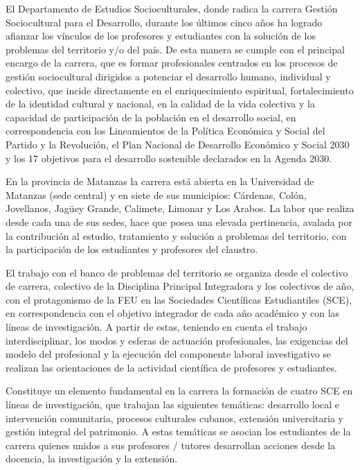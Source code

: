 El Departamento de Estudios Socioculturales, donde radica la carrera Gestión Sociocultural para el Desarrollo, durante los últimos cinco años ha logrado afianzar los vínculos de los profesores y estudiantes con la solución de los problemas del territorio y/o del país. De esta manera se cumple con el principal encargo de la carrera, que es formar profesionales centrados en los procesos de gestión sociocultural dirigidos a potenciar el desarrollo humano, individual y colectivo, que incide directamente en el enriquecimiento espiritual, fortalecimiento de la identidad cultural y nacional, en la calidad de la vida colectiva y la capacidad de participación de la población en el desarrollo social, en correspondencia con los Lineamientos de la Política Económica y Social del Partido y la Revolución, el Plan Nacional de Desarrollo Económico y Social 2030 y los 17 objetivos para el desarrollo sostenible declarados en la Agenda 2030. 

En la provincia de Matanzas la carrera está abierta en la Universidad de Matanzas (sede central) y en siete de sus municipios: Cárdenas, Colón, Jovellanos, Jagüey Grande, Calimete, Limonar y Los Arabos. La labor que realiza desde cada una de sus sedes, hace que posea una elevada pertinencia, avalada por la contribución al estudio, tratamiento y solución a problemas del territorio, con la participación de los estudiantes y profesores del claustro.

El trabajo con el banco de problemas del territorio se organiza desde el colectivo de carrera, colectivo de la Disciplina Principal Integradora y los colectivos de año, con el protagonismo de la FEU en las Sociedades Científicas Estudiantiles (SCE), en correspondencia con el objetivo integrador de cada año académico y con las líneas de investigación. A partir de estas, teniendo en cuenta el trabajo interdisciplinar, los modos y esferas de actuación profesionales, las exigencias del modelo del profesional y la ejecución del componente laboral investigativo se realizan las orientaciones de la actividad científica de profesores y estudiantes.

Constituye un elemento fundamental en la carrera la formación de cuatro SCE en líneas de investigación, que trabajan las siguientes temáticas: desarrollo local e intervención comunitaria, procesos culturales cubanos, extensión universitaria y gestión integral del patrimonio. A estas temáticas se asocian los estudiantes de la carrera quienes unidos a sus profesores / tutores desarrollan acciones desde la docencia, la investigación y la extensión.

